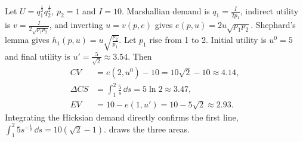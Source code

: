\begin{example}\label{ex:05-cobb-douglas}
Let $U = q_1^{\frac{1}{2}}q_2^{\frac{1}{2}}$, $p_2 = 1$ and $I = 10$. Marshallian demand is
$q_1 = \frac{I}{2p_1}$, indirect utility is $v = \frac{I}{2\sqrt{p_1p_2}}$, and inverting $u = v(p, e)$ gives
$e(p, u) = 2u\sqrt{p_1p_2}$. Shephard's lemma gives $h_1(p, u) = u\sqrt{\frac{p_2}{p_1}}$. Let $p_1$ rise from
1 to 2. Initial utility is $u^0 = 5$ and final utility is $u' = \frac{5}{\sqrt{2}} \approx 3.54$. Then
\begin{align*}
CV &= e(2, u^0) - 10 = 10\sqrt{2} - 10 \approx 4.14, \\
\Delta CS &= \int_1^2\frac{5}{s}\,\dd s = 5\ln 2 \approx 3.47, \\
EV &= 10 - e(1, u') = 10 - 5\sqrt{2} \approx 2.93 .
\end{align*}
Integrating the Hicksian demand directly confirms the first line,
$\int_1^2 5s^{-\frac{1}{2}}\,\dd s = 10(\sqrt{2} - 1)$.  draws the three areas.
\end{example}

